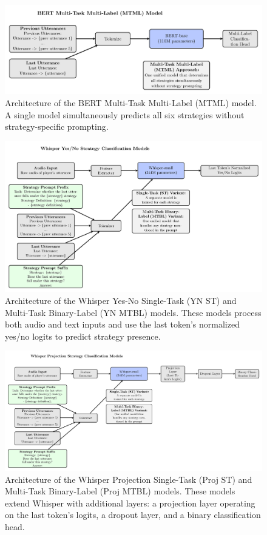 \documentclass{article}
\begin{document}
\begin{figure}[H]
    \centering
    \includegraphics[width=\textwidth]{figures/png/bert_mtml.png}
    \caption{Architecture of the BERT Multi-Task Multi-Label (MTML) model. A single model simultaneously predicts all six strategies without strategy-specific prompting.}
    \label{fig:app_bert_mtml}
\end{figure}

\begin{figure}[H]
    \centering
    \includegraphics[width=\textwidth]{figures/png/whisper_yn_st_and_mtbl.png}
    \caption{Architecture of the Whisper Yes-No Single-Task (YN ST) and Multi-Task Binary-Label (YN MTBL) models. These models process both audio and text inputs and use the last token's normalized yes/no logits to predict strategy presence.}
    \label{fig:app_whisper_yn_st_and_mtbl}
\end{figure}

\begin{figure}[H]
    \centering
    \includegraphics[width=\textwidth]{figures/png/whisper_proj_st_and_mtbl.png}
    \caption{Architecture of the Whisper Projection Single-Task (Proj ST) and Multi-Task Binary-Label (Proj MTBL) models. These models extend Whisper with additional layers: a projection layer operating on the last token's logits, a dropout layer, and a binary classification head.}
    \label{fig:app_whisper_proj_st_and_mtbl}
\end{figure}
\end{document}
